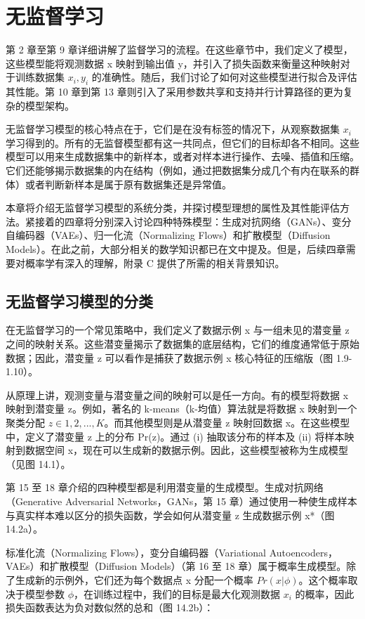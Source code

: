 \chapter{无监督学习}

第 2 章至第 9 章详细讲解了监督学习的流程。在这些章节中，我们定义了模型，这些模型能将观测数据 x 映射到输出值 y，并引入了损失函数来衡量这种映射对于训练数据集 \({x_i , y_i }\) 的准确性。随后，我们讨论了如何对这些模型进行拟合及评估其性能。第 10 章到第 13 章则引入了采用参数共享和支持并行计算路径的更为复杂的模型架构。

无监督学习模型的核心特点在于，它们是在没有标签的情况下，从观察数据集 \({x_i}\) 学习得到的。所有的无监督模型都有这一共同点，但它们的目标却各不相同。这些模型可以用来生成数据集中的新样本，或者对样本进行操作、去噪、插值和压缩。它们还能够揭示数据集的内在结构（例如，通过把数据集分成几个有内在联系的群体）或者判断新样本是属于原有数据集还是异常值。

本章将介绍无监督学习模型的系统分类，并探讨模型理想的属性及其性能评估方法。紧接着的四章将分别深入讨论四种特殊模型：生成对抗网络（GANs）、变分自编码器（VAEs）、归一化流（Normalizing Flows）和扩散模型（Diffusion Models）。在此之前，大部分相关的数学知识都已在文中提及。但是，后续四章需要对概率学有深入的理解，附录 C 提供了所需的相关背景知识。

\section{无监督学习模型的分类}
在无监督学习的一个常见策略中，我们定义了数据示例 x 与一组未见的潜变量 z 之间的映射关系。这些潜变量揭示了数据集的底层结构，它们的维度通常低于原始数据；因此，潜变量 z 可以看作是捕获了数据示例 x 核心特征的压缩版（图 1.9-1.10）。

从原理上讲，观测变量与潜变量之间的映射可以是任一方向。有的模型将数据 x 映射到潜变量 z。例如，著名的 k-means（k-均值）算法就是将数据 x 映射到一个聚类分配 \(z \in {1,2,...,K}\)。而其他模型则是从潜变量 z 映射回数据 x。在这些模型中，定义了潜变量 z 上的分布 Pr(z)。通过 (i) 抽取该分布的样本及 (ii) 将样本映射到数据空间 x，现在可以生成新的数据示例。因此，这些模型被称为生成模型（见图 14.1）。

第 15 至 18 章介绍的四种模型都是利用潜变量的生成模型。生成对抗网络（Generative Adversarial Networks，GANs，第 15 章）通过使用一种使生成样本与真实样本难以区分的损失函数，学会如何从潜变量 z 生成数据示例 x*（图 14.2a）。

标准化流（Normalizing Flows），变分自编码器（Variational Autoencoders，VAEs）和扩散模型（Diffusion Models）（第 16 至 18 章）属于概率生成模型。除了生成新的示例外，它们还为每个数据点 x 分配一个概率 \(Pr(x|\phi)\)。这个概率取决于模型参数 \(\phi\)，在训练过程中，我们的目标是最大化观测数据 \(x_i\) 的概率，因此损失函数表达为负对数似然的总和（图 14.2b）：

